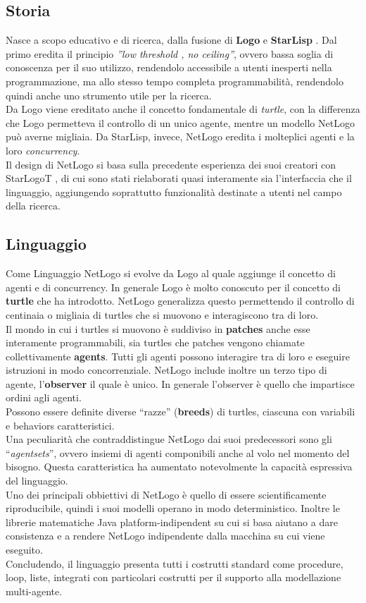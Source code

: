 \subsection{Storia}
Nasce a scopo educativo e di ricerca, dalla fusione di \textbf{Logo} \cite{logo} e \textbf{StarLisp} \cite{starlisp}. Dal primo eredita il principio \textit{”low threshold , no ceiling”}, ovvero bassa soglia di conoscenza per il suo utilizzo, rendendolo accessibile a utenti inesperti nella programmazione, ma allo stesso tempo completa programmabilità, rendendolo quindi anche uno strumento utile per la ricerca.\\
Da Logo viene ereditato anche il concetto fondamentale di \textit{turtle}, con la differenza che Logo permetteva il controllo di un unico agente, mentre un modello NetLogo può averne migliaia. Da StarLisp, invece, NetLogo eredita i molteplici agenti e la loro \textit{concurrency}.\\
Il design di NetLogo si basa sulla precedente esperienza dei suoi creatori con StarLogoT \cite{starlogot}, di cui sono stati rielaborati quasi interamente sia l'interfaccia che il linguaggio, aggiungendo soprattutto funzionalità destinate a utenti nel campo della ricerca.

\subsection{Linguaggio}
Come Linguaggio NetLogo si evolve da Logo al quale aggiunge il concetto di agenti e di concurrency. In generale Logo è molto conoscuto per il concetto di \textbf{turtle} che ha introdotto. NetLogo generalizza questo permettendo il controllo di centinaia o migliaia di turtles che si muovono e interagiscono tra di loro.\\
Il mondo in cui i turtles si muovono è suddiviso in \textbf{patches} anche esse interamente programmabili, sia turtles che patches vengono chiamate collettivamente \textbf{agents}. Tutti gli agenti possono interagire tra di loro e eseguire istruzioni in modo concorrenziale. NetLogo include inoltre un terzo tipo di agente, l'\textbf{observer} il quale è unico. In generale l'observer è quello che impartisce ordini agli agenti.\\
Possono essere definite diverse “razze” (\textbf{breeds}) di turtles, ciascuna con variabili e behaviors caratteristici.\\
Una peculiarità che contraddistingue NetLogo dai suoi predecessori sono gli “\textit{agentsets}”, ovvero insiemi di agenti componibili anche al volo nel momento del bisogno. Questa caratteristica ha aumentato notevolmente la capacità espressiva del linguaggio.\\
Uno dei principali obbiettivi di NetLogo è quello di essere scientificamente riproducibile, quindi i suoi modelli operano in modo deterministico. Inoltre le librerie matematiche Java platform-indipendent su cui si basa aiutano a dare consistenza e a rendere NetLogo indipendente dalla macchina su cui viene eseguito.\\
Concludendo, il linguaggio presenta tutti i costrutti standard come procedure, loop, liste, integrati con particolari costrutti per il supporto alla modellazione multi-agente.

